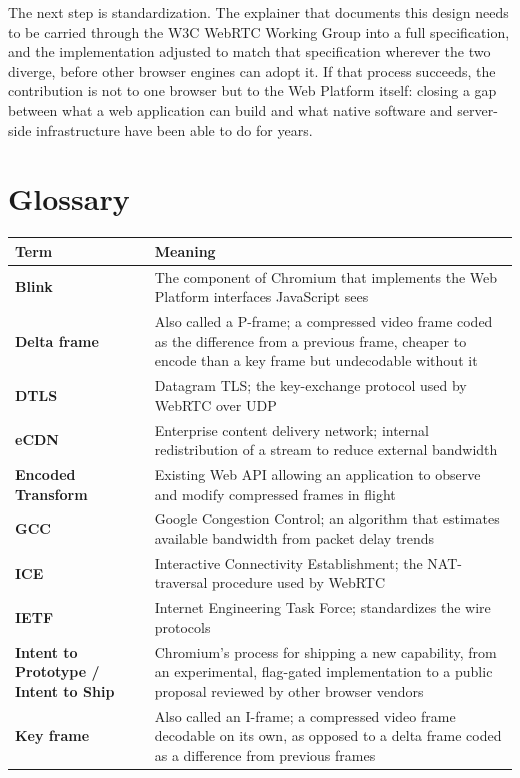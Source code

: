 \documentclass[11pt]{article}
\begin{document}
The next step is standardization. The explainer that documents this design needs to be carried through the W3C WebRTC Working Group into a full specification, and the implementation adjusted to match that specification wherever the two diverge, before other browser engines can adopt it. If that process succeeds, the contribution is not to one browser but to the Web Platform itself: closing a gap between what a web application can build and what native software and server-side infrastructure have been able to do for years.

\appendix

\section{Glossary}
\label{app:glossary}

\begin{longtable}{@{}p{}p{}@{}}
\toprule
\textbf{Term} & \textbf{Meaning} \\
\midrule
\endhead
\textbf{Blink} & The component of Chromium that implements the Web Platform interfaces JavaScript sees \\
\textbf{Delta frame} & Also called a P-frame; a compressed video frame coded as the difference from a previous frame, cheaper to encode than a key frame but undecodable without it \\
\textbf{DTLS} & Datagram TLS; the key-exchange protocol used by WebRTC over UDP \\
\textbf{eCDN} & Enterprise content delivery network; internal redistribution of a stream to reduce external bandwidth \\
\textbf{Encoded Transform} & Existing Web API allowing an application to observe and modify compressed frames in flight \\
\textbf{GCC} & Google Congestion Control; an algorithm that estimates available bandwidth from packet delay trends \\
\textbf{ICE} & Interactive Connectivity Establishment; the NAT-traversal procedure used by WebRTC \\
\textbf{IETF} & Internet Engineering Task Force; standardizes the wire protocols \\
\textbf{Intent to Prototype / Intent to Ship} & Chromium's process for shipping a new capability, from an experimental, flag-gated implementation to a public proposal reviewed by other browser vendors \\
\textbf{Key frame} & Also called an I-frame; a compressed video frame decodable on its own, as opposed to a delta frame coded as a difference from previous frames \\

\end{longtable}
\end{document}
